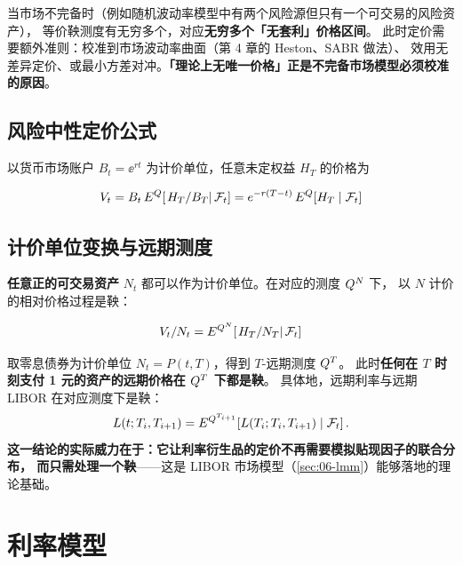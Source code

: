\begin{notebox}[不完备市场意味着什么]
当市场不完备时（例如随机波动率模型中有两个风险源但只有一个可交易的风险资产），
等价鞅测度有无穷多个，对应\textbf{无穷多个「无套利」价格区间}。
此时定价需要额外准则：校准到市场波动率曲面（第 4 章的 Heston、SABR 做法）、
效用无差异定价、或最小方差对冲。\textbf{「理论上无唯一价格」正是不完备市场模型必须校准的原因}。
\end{notebox}

\subsection{风险中性定价公式}

以货币市场账户 $B_t = \ee^{rt}$ 为计价单位，任意未定权益 $H_T$ 的价格为

\begin{equation}
  V_t = B_t\,E^{Q}\!\left[\left.H_T/B_T\right|\mathcal{F}_t\right]
      = e^{-r(T-t)}\,E^{Q}\!\left[H_T\mid\mathcal{F}_t\right]
  \label{eq:06-rn-formula}
\end{equation}

\subsection{计价单位变换与远期测度}

\textbf{任意正的可交易资产} $N_t$ 都可以作为计价单位。在对应的测度 $Q^{N}$ 下，
以 $N$ 计价的相对价格过程是鞅：

\begin{equation}
  V_t/N_t = E^{Q^{N}}\!\left[\left.H_T/N_T\right|\mathcal{F}_t\right]
  \label{eq:06-numeraire}
\end{equation}

\begin{example}\label{ex:06-forward-measure}
取零息债券为计价单位 $N_t = P(t,T)$，得到 $T$-远期测度 $Q^{T}$。
此时\textbf{任何在 $T$ 时刻支付 1 元的资产的远期价格在 $Q^{T}$ 下都是鞅}。
具体地，远期利率与远期 LIBOR 在对应测度下是鞅：
\[
  L(t;T_i,T_{i+1}) = E^{Q^{T_{i+1}}}\!\left[L(T_i;T_i,T_{i+1})\mid\mathcal{F}_t\right].
\]
\textbf{这一结论的实际威力在于：它让利率衍生品的定价不再需要模拟贴现因子的联合分布，
而只需处理一个鞅}——这是 LIBOR 市场模型（\cref{sec:06-lmm}）能够落地的理论基础。
\end{example}

\section{利率模型}

